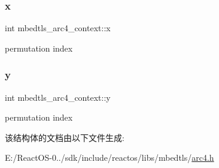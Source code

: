 \subsubsection{\texorpdfstring{x}{x}}
{\footnotesize\ttfamily int mbedtls\+\_\+arc4\+\_\+context\+::x}

permutation index \mbox{\label{structmbedtls__arc4__context_a53d6a6d70c2b3ef5cd4467ae32e21429}} 
\subsubsection{\texorpdfstring{y}{y}}
{\footnotesize\ttfamily int mbedtls\+\_\+arc4\+\_\+context\+::y}

permutation index 

该结构体的文档由以下文件生成\+:\begin{DoxyCompactItemize}
\item 
E\+:/\+React\+O\+S-\/0../sdk/include/reactos/libs/mbedtls/\hyperlink{arc4_8h}{arc4.\+h}\end{DoxyCompactItemize}
